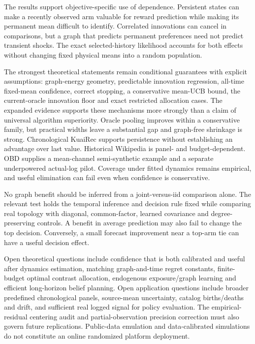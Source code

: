 The results support objective-specific use of dependence. Persistent states can make a recently observed arm valuable for reward prediction while making its permanent mean difficult to identify. Correlated innovations can cancel in comparisons, but a graph that predicts permanent preferences need not predict transient shocks. The exact selected-history likelihood accounts for both effects without changing fixed physical means into a random population.

The strongest theoretical statements remain conditional guarantees with explicit assumptions: graph-energy geometry, predictable innovation regression, all-time fixed-mean confidence, correct stopping, a conservative mean-UCB bound, the current-oracle innovation floor and exact restricted allocation cases. The expanded evidence supports these mechanisms more strongly than a claim of universal algorithm superiority. Oracle pooling improves within a conservative family, but practical widths leave a substantial gap and graph-free shrinkage is strong. Chronological KuaiRec supports persistence without establishing an advantage over last value. Historical Wikipedia is panel- and budget-dependent. OBD supplies a mean-channel semi-synthetic example and a separate underpowered actual-log pilot. Coverage under fitted dynamics remains empirical, and useful elimination can fail even when confidence is conservative.

No graph benefit should be inferred from a joint-versus-iid comparison alone. The relevant test holds the temporal inference and decision rule fixed while comparing real topology with diagonal, common-factor, learned covariance and degree-preserving controls. A benefit in average prediction may also fail to change the top decision. Conversely, a small forecast improvement near a top-arm tie can have a useful decision effect.

Open theoretical questions include confidence that is both calibrated and useful after dynamics estimation, matching graph-and-time regret constants, finite-budget optimal contrast allocation, endogenous exposure/graph learning and efficient long-horizon belief planning. Open application questions include broader predefined chronological panels, source-mean uncertainty, catalog births/deaths and drift, and sufficient real logged signal for policy evaluation. The empirical-residual centering audit and partial-observation precision correction must also govern future replications. Public-data emulation and data-calibrated simulations do not constitute an online randomized platform deployment.

